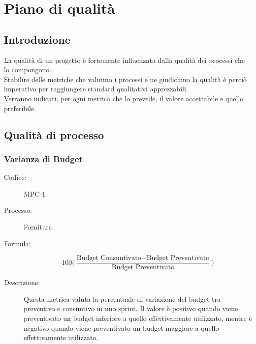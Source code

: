 \chapter{Piano di qualità}

\section{Introduzione}
\label{sec:qualityintro}
La qualità di un progetto è fortemente influenzata dalla qualità dei processi che lo compongono.\\ Stabilire delle metriche che valutino i processi e ne giudichino la qualità è perciò imperativo per raggiungere standard qualitativi apprezzabili.\\ Verranno indicati, per ogni metrica che lo prevede, il valore accettabile e quello preferibile.

\section{Qualità di processo} \label{sec:qualityproc}
\subsection{Varianza di Budget}
\begin{description}
    \item[Codice:] MPC-1
    \item[Processo:] Fornitura.
    \item[Formula:] 
    \begin{equation}
        100\biggl(\frac{\text{Budget Consuntivato} - \text{Budget Preventivato}}{\text{Budget Preventivato}}\biggr)
    \end{equation}
    \item[Descrizione:] Questa metrica valuta la percentuale di variazione del budget tra preventivo e consuntivo in uno sprint. Il valore è positivo quando viene preventivato un budget inferiore a quello effettivamente utilizzato, mentre è negativo quando viene preventivato un budget maggiore a quello effettivamente utilizzato.
\end{description}

